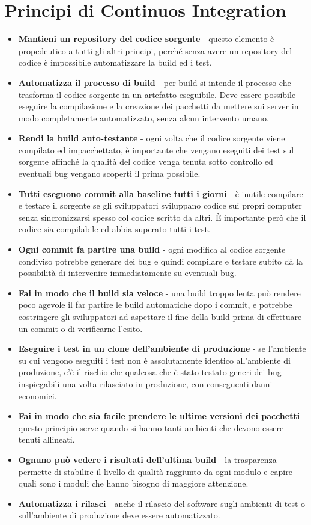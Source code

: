 \documentclass[a4paper,12pt,titlepage,oneside]{book}
\begin{document}
\section{Principi di Continuos Integration}
\begin{itemize}
    \item \textbf{Mantieni un repository del codice sorgente} - questo elemento è propedeutico a tutti gli altri principi, perché senza avere un repository del codice è impossibile automatizzare la build ed i test.
    \item \textbf{Automatizza il processo di build} - per build si intende il processo che trasforma il codice sorgente in un artefatto eseguibile. Deve essere possibile eseguire la compilazione e la creazione dei pacchetti 
        da mettere sui server in modo completamente automatizzato, senza alcun intervento umano.
    \item \textbf{Rendi la build auto-testante} - ogni volta che il codice sorgente viene compilato ed impacchettato, è importante che vengano eseguiti dei test sul sorgente affinché la qualità del codice venga 
        tenuta sotto controllo ed eventuali bug vengano scoperti il prima possibile.
    \item \textbf{Tutti eseguono commit alla baseline tutti i giorni} - è inutile compilare e testare il sorgente se gli sviluppatori sviluppano codice sui propri computer senza sincronizzarsi spesso col codice scritto 
        da altri. È importante però che il codice sia compilabile ed abbia superato tutti i test.
    \item \textbf{Ogni commit fa partire una build} - ogni modifica al codice sorgente condiviso potrebbe generare dei bug e quindi compilare e testare subito dà la possibilità di intervenire immediatamente su eventuali bug.
    \item \textbf{Fai in modo che il build sia veloce} - una build troppo lenta può rendere poco agevole il far partire le build automatiche dopo i commit, e potrebbe costringere gli sviluppatori ad aspettare il fine della build 
        prima di effettuare un commit o di verificarne l'esito.
    \item \textbf{Eseguire i test in un clone dell'ambiente di produzione} - se l'ambiente su cui vengono eseguiti i test non è assolutamente identico all'ambiente di produzione, c'è il rischio che qualcosa che è stato testato 
        generi dei bug inspiegabili una volta rilasciato in produzione, con conseguenti danni economici.
    \item \textbf{Fai in modo che sia facile prendere le ultime versioni dei pacchetti} - questo principio serve quando si hanno tanti ambienti che devono essere tenuti allineati.
    \item \textbf{Ognuno può vedere i risultati dell'ultima build} - la trasparenza permette di stabilire il livello di qualità raggiunto da ogni modulo e capire quali sono i moduli che hanno bisogno di maggiore attenzione.
    \item \textbf{Automatizza i rilasci} - anche il rilascio del software sugli ambienti di test o sull'ambiente di produzione deve essere automatizzato.
\end{itemize}
\end{document}
